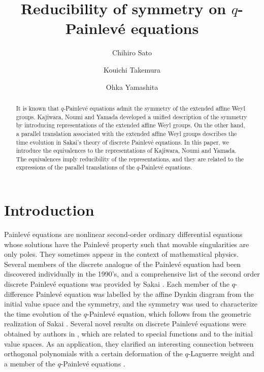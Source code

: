 \documentclass[12pt]{amsart}
\numberwithin{equation}{section}
\theoremstyle{definition}
\begin{document}
\title[Reducibility of symmetry on $q$-Painlev\'e equations]
{Reducibility of symmetry on $q$-Painlev\'e equations}
\author{Chihiro Sato}
\address{Department of Mathematics, Ochanomizu University, 2-1-1 Otsuka, Bunkyo-ku, Tokyo 112-8610, Japan}
\author{Kouichi Takemura}
\address{Department of Mathematics, Ochanomizu University, 2-1-1 Otsuka, Bunkyo-ku, Tokyo 112-8610, Japan}
\author{Ohka Yamashita}
\address{Department of Mathematics, Ochanomizu University, 2-1-1 Otsuka, Bunkyo-ku, Tokyo 112-8610, Japan}
\begin{abstract}
It is known that $q$-Painlev\'e equations admit the symmetry of the extended affine Weyl groups.
Kajiwara, Noumi and Yamada developed a unified description of the symmetry by introducing representations of the extended affine Weyl groups.
On the other hand, a parallel translation associated with the extended affine Weyl groups describes the time evolution in Sakai's theory of discrete Painlev\'e equations.
In this paper, we introduce the equivalences to the representations of Kajiwara, Noumi and Yamada.
The equivalences imply reducibility of the representations, and they are related to the expressions of the parallel translations of the $q$-Painlev\'e equations.
\end{abstract}
\maketitle

\section{Introduction}

Painlev\'e equations are nonlinear second-order ordinary differential equations whose solutions have the Painlev\'e property such that movable singularities are only poles.
They sometimes appear in the context of mathematical physics.
Several members of the discrete analogue of the Painlev\'e equation had been discovered individually in the 1990's, and a comprehensive list of the second order discrete Painlev\'e equations was provided by Sakai \cite{Sak}.
Each member of the $q$-difference Painlev\'e equation was labelled by the affine Dynkin diagram from the initial value space and the symmetry, and the symmetry was used to characterize the time evolution of the $q$-Painlev\'e equation, which follows from the geometric realization of Sakai \cite{Sak}.
Several novel results on discrete Painlev\'e equations were obtained by authors in \cite{HDC20,DFS20,DFS22,HDC25}, which are related to special functions and to the initial value spaces.
As an application, they clarified an interesting connection between orthogonal polynomials with a certain deformation of the $q$-Laguerre weight and a member of the $q$-Painlev\'e equations \cite{HDC25}.
\end{document}
